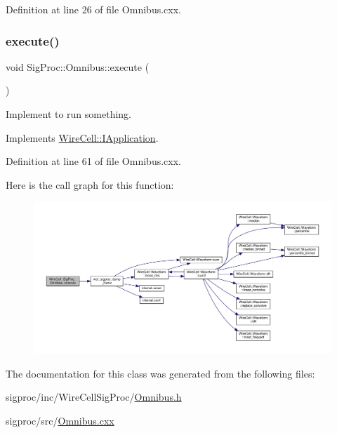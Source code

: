 Definition at line 26 of file Omnibus.\+cxx.

\mbox{\label{class_wire_cell_1_1_sig_proc_1_1_omnibus_ab79548e4b108f011bfc6dd1dae434804}} 
\subsubsection{\texorpdfstring{execute()}{execute()}}
{\footnotesize\ttfamily void Sig\+Proc\+::\+Omnibus\+::execute (\begin{DoxyParamCaption}{ }\end{DoxyParamCaption})\hspace{0.3cm}{\ttfamily [virtual]}}



Implement to run something. 



Implements \hyperlink{class_wire_cell_1_1_i_application_a5c77275a37093541aaad6410d8ce5c31}{Wire\+Cell\+::\+I\+Application}.



Definition at line 61 of file Omnibus.\+cxx.

Here is the call graph for this function\+:
\nopagebreak
\begin{figure}[H]
\begin{center}
\leavevmode
\includegraphics[width=350pt]{class_wire_cell_1_1_sig_proc_1_1_omnibus_ab79548e4b108f011bfc6dd1dae434804_cgraph}
\end{center}
\end{figure}


The documentation for this class was generated from the following files\+:\begin{DoxyCompactItemize}
\item 
sigproc/inc/\+Wire\+Cell\+Sig\+Proc/\hyperlink{_omnibus_8h}{Omnibus.\+h}\item 
sigproc/src/\hyperlink{_omnibus_8cxx}{Omnibus.\+cxx}\end{DoxyCompactItemize}
